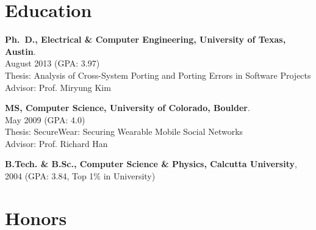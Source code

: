\documentclass[overlapped,line,letterpaper, 12pt]{res}
\begin{document}
\begin{resume}
\section{\bf Education}

{\bf Ph.~D., Electrical \& Computer Engineering, University of Texas, Austin}. \\
  August 2013  (GPA: 3.97)\\
Thesis: Analysis of Cross-System Porting and Porting Errors in Software Projects \\
Advisor: Prof. Miryung Kim 

{\bf MS, Computer Science, University of Colorado, Boulder}. \\ 
May 2009 (GPA: 4.0) \\
Thesis: SecureWear: Securing Wearable Mobile Social Networks \\
Advisor: Prof. Richard Han



{\bf B.Tech. \& B.Sc., Computer Science \& Physics, Calcutta University}, \\ 2004 
(GPA: 3.84, Top 1\% in University)




\section{\bf Honors}


\end{resume}
\end{document}
